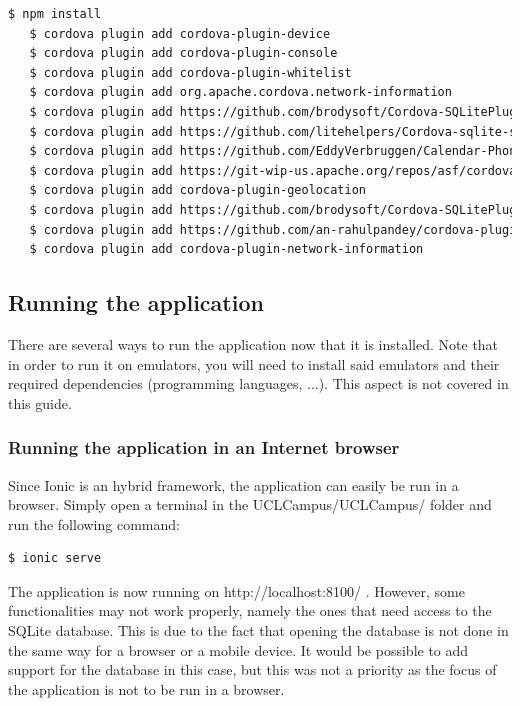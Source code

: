 \documentclass[11pt, a4paper]{report}
\begin{document}
\begin{lstlisting}[language=bash]
   $ npm install
   $ cordova plugin add cordova-plugin-device
   $ cordova plugin add cordova-plugin-console
   $ cordova plugin add cordova-plugin-whitelist
   $ cordova plugin add org.apache.cordova.network-information
   $ cordova plugin add https://github.com/brodysoft/Cordova-SQLitePlugin.git
   $ cordova plugin add https://github.com/litehelpers/Cordova-sqlite-storage.git
   $ cordova plugin add https://github.com/EddyVerbruggen/Calendar-PhoneGap-Plugin.git
   $ cordova plugin add https://git-wip-us.apache.org/repos/asf/cordova-plugin-inappbrowser.git
   $ cordova plugin add cordova-plugin-geolocation
   $ cordova plugin add https://github.com/brodysoft/Cordova-SQLitePlugin.git
   $ cordova plugin add https://github.com/an-rahulpandey/cordova-plugin-dbcopy.git
   $ cordova plugin add cordova-plugin-network-information
\end{lstlisting}

\subsection{Running the application}

There are several ways to run the application now that it is installed. Note that in order to run it on emulators, you will need to install said emulators and their required dependencies (programming languages, ...). This aspect is not covered in this guide.

\subsubsection{Running the application in an Internet browser}

Since Ionic is an hybrid framework, the application can easily be run in a browser. Simply open a terminal in the UCLCampus/UCLCampus/ folder and run the following command:

\begin{lstlisting}[language=bash]
   $ ionic serve
\end{lstlisting} 

The application is now running on http://localhost:8100/ . However, some functionalities may not work properly, namely the ones that need access to the SQLite database. This is due to the fact that opening the database is not done in the same way for a browser or a mobile device. It would be possible to add support for the database in this case, but this was not a priority as the focus of the application is not to be run in a browser.
\end{document}

